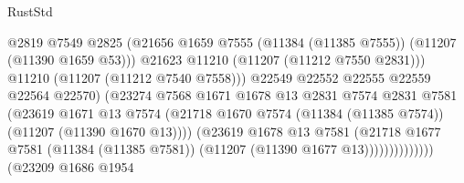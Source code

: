 \begin{lexlean}{RustStd}
\begin{coremodule}
                                              @2819
                                              @7549
                                              @2825
                                              (@21656
                                                @1659
                                                @7555
                                                (@11384 (@11385 @7555))
                                                (@11207 (@11390 @1659 @53)))
                                              @21623
                                              @11210
                                              (@11207 (@11212 @7550 @2831)))
                                            @11210
                                            (@11207 (@11212 @7540 @7558)))
                                          @22549
                                          @22552
                                          @22555
                                          @22559
                                          @22564
                                          @22570)
                                        (@23274
                                          @7568
                                          @1671
                                          @1678
                                          @13
                                          @2831
                                          @7574
                                          @2831
                                          @7581
                                          (@23619
                                            @1671
                                            @13
                                            @7574
                                            (@21718
                                              @1670
                                              @7574
                                              (@11384 (@11385 @7574))
                                              (@11207 (@11390 @1670 @13))))
                                          (@23619
                                            @1678
                                            @13
                                            @7581
                                            (@21718
                                              @1677
                                              @7581
                                              (@11384 (@11385 @7581))
                                              (@11207 (@11390 @1677 @13))))))))))))))
                      (@23209
                        @1686
                        @1954

\end{coremodule}
\end{lexlean}
